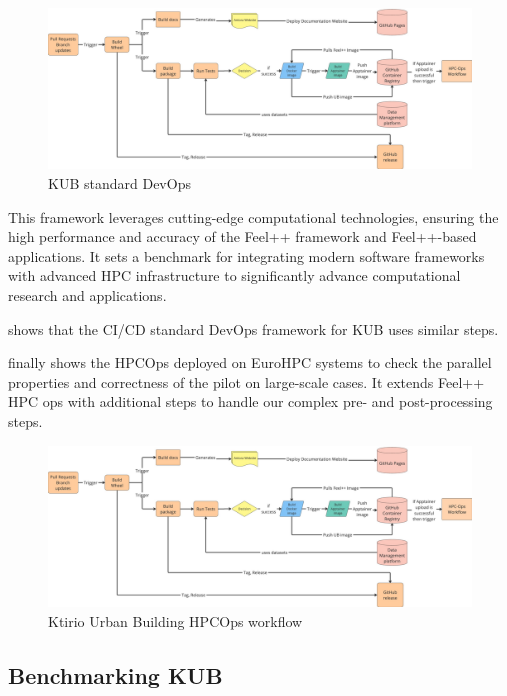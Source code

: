 \documentclass[runningheads]{llncs}
\begin{document}
\begin{figure}
    \centering
    \includegraphics[width=\linewidth,page=1]{img-ub-devops-hpcops.pdf}
    \caption{KUB standard DevOps}
    \label{fig:kub-devops}
\end{figure}
This framework leverages cutting-edge computational technologies, ensuring the high performance and accuracy of the Feel++ framework and Feel++-based applications.
It sets a benchmark for integrating modern software frameworks with advanced HPC infrastructure to significantly advance computational research and applications.

 shows that the CI/CD standard DevOps framework for KUB uses similar steps.



 finally shows the HPCOps deployed on EuroHPC systems to check the parallel properties and correctness of the pilot on large-scale cases. It extends Feel++ HPC ops with additional steps to handle our complex pre- and post-processing steps.

\begin{figure}
    \centering
    \includegraphics[width=\linewidth,page=2]{img-ub-devops-hpcops.pdf}
    \caption{Ktirio Urban Building HPCOps workflow}
    \label{fig:kub-hpcops}
\end{figure}

\subsection{Benchmarking KUB}
\label{sec:benchmarking}
\end{document}
